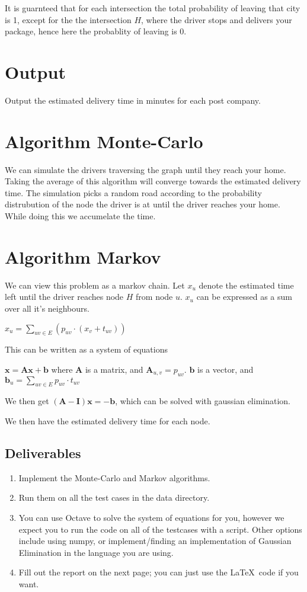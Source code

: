 \documentclass{tufte-handout}
\begin{document}
It is guarnteed that for each intersection the total probability of leaving that city is 1, 
except for the the intersection $H$, where the driver stops and delivers your package, hence here the probablity of leaving is 0.

\section*{Output}
Output the estimated delivery time in minutes for each post company.


\section*{Algorithm Monte-Carlo}
We can simulate the drivers traversing the graph until they reach your home.
Taking the average of this algorithm will converge towards the estimated delivery time.
The simulation picks a random road according to the probability distrubution 
of the node the driver is at until the driver reaches your home. While doing this we accumelate the time.


\section*{Algorithm Markov}
We can view this problem as a markov chain. 
Let $x_u$ denote the estimated time left until the driver reaches node $H$ from node $u$.
$x_u$ can be expressed as a sum over all it's neighbours.

$x_u = \sum_{uv \in E} (p_{uv}\cdot (x_v + t_{uv}))$

This can be written as a system of equations

$\bm{x} = \bm{Ax} + \bm{b}$
where $\bm{A}$ is a matrix, and $\bm{A}_{u,v} = p_{uv}$. $\bm{b}$ is a vector, and $\bm{b}_u = \sum_{uv \in E}{p_{uv}\cdot t_{uv}}$

We then get $(\bm{A}-\bm{I})\bm{x} = -\bm{b}$, which can be solved with gaussian elimination.

We then have the estimated delivery time for each node.

\subsection{Deliverables}

\begin{enumerate}
\item Implement the Monte-Carlo and Markov algorithms.
\item Run them on all the test cases in the data directory.
\item You can use Octave to solve the system of equations for you, 
    however we expect you to run the code on all of the testcases with a script.
    Other options include using numpy, or implement/finding an implementation of
        Gaussian Elimination in the language you are using.
\item Fill out the report on the next page; you can just use the
  \LaTeX\ code if you want.
\end{enumerate}
\end{document}
